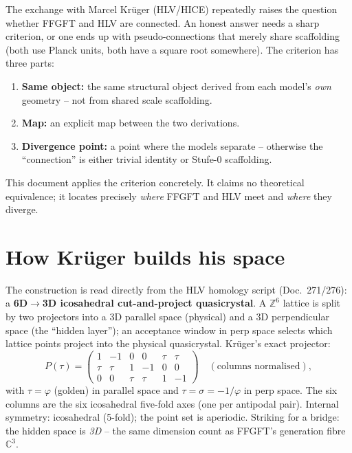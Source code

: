 The exchange with Marcel Kr\"uger (HLV/HICE) repeatedly raises the question
whether FFGFT and HLV are connected. An honest answer needs a sharp criterion, or
one ends up with pseudo-connections that merely share scaffolding (both use
Planck units, both have a square root somewhere). The criterion has three parts:
\begin{enumerate}
\item \textbf{Same object:} the same structural object derived from each model's
      \emph{own} geometry -- not from shared scale scaffolding.
\item \textbf{Map:} an explicit map between the two derivations.
\item \textbf{Divergence point:} a point where the models separate -- otherwise the
      ``connection'' is either trivial identity or Stufe-0 scaffolding.
\end{enumerate}
This document applies the criterion concretely. It claims no theoretical
equivalence; it locates precisely \emph{where} FFGFT and HLV meet and \emph{where}
they diverge.

\section{How Kr\"uger builds his space}

The construction is read directly from the HLV homology script (Doc.~271/276): a
\textbf{6D$\to$3D icosahedral cut-and-project quasicrystal}. A $\mathbb{Z}^6$
lattice is split by two projectors into a 3D parallel space (physical) and a 3D
perpendicular space (the ``hidden layer''); an acceptance window in perp space
selects which lattice points project into the physical quasicrystal. Kr\"uger's
exact projector:
\[
P(\tau)=\begin{pmatrix}
1 & -1 & 0 & 0 & \tau & \tau\\
\tau & \tau & 1 & -1 & 0 & 0\\
0 & 0 & \tau & \tau & 1 & -1
\end{pmatrix}\quad(\text{columns normalised}),
\]
with $\tau=\varphi$ (golden) in parallel space and $\tau=\sigma=-1/\varphi$ in perp
space. The six columns are the six icosahedral five-fold axes (one per antipodal
pair). Internal symmetry: icosahedral (5-fold); the point set is aperiodic.
Striking for a bridge: the hidden space is \emph{3D} -- the same dimension count
as FFGFT's generation fibre $\mathbb{C}^3$.


